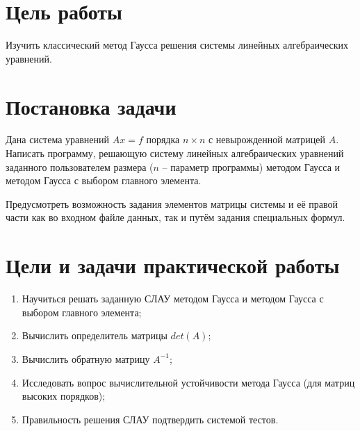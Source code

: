 \newpage
\section{Цель работы}

Изучить классический метод Гаусса решения системы линейных алгебраических уравнений.

\section{Постановка задачи}

Дана система уравнений $Ax = f$ порядка $n \times n$ с невырожденной матрицей $A$.
Написать программу, решающую систему линейных алгебраических уравнений заданного пользователем размера
($n$ -- параметр программы) методом Гаусса и методом Гаусса с выбором главного элемента.
\par

Предусмотреть возможность задания элементов матрицы системы и её правой части как во входном файле данных,
так и путём задания специальных формул.
\par

\section{Цели и задачи практической работы}
\begin{enumerate}
    \item Научиться решать заданную СЛАУ методом Гаусса и методом Гаусса с выбором главного элемента;
    \item Вычислить определитель матрицы $det(A)$;
    \item Вычислить обратную матрицу $A^{-1}$;
    \item Исследовать вопрос вычислительной устойчивости метода Гаусса (для матриц высоких порядков);
    \item Правильность решения СЛАУ подтвердить системой тестов.
\end{enumerate}
